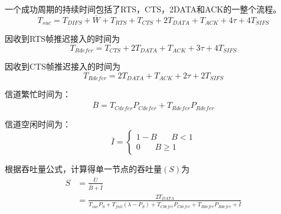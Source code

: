 一个成功周期的持续时间包括了RTS，CTS，2DATA和ACK的一整个流程。
\begin{equation}
T_{suc}=T_{DIFS}+\overline W+T_{RTS}+T_{CTS}+2T_{DATA}+T_{ACK}+4\tau+4T_{SIFS}
\end{equation}

因收到RTS帧推迟接入的时间为
\begin{equation}
T_{Rdefer}=T_{CTS}+2T_{DATA}+T_{ACK}+3\tau+4T_{SIFS}
\end{equation}

因收到CTS帧推迟接入的时间为
\begin{equation}
T_{Rdefer}=2T_{DATA}+T_{ACK}+2\tau+2T_{SIFS}
\end{equation}

信道繁忙时间为：
\begin{equation}
\overline B=T_{Cdefer}P_{Cdefer}+T_{Rdefer}P_{Rdefer}
\end{equation}

信道空闲时间为：
\begin{equation}
\overline I=\left\{
\begin{aligned}
1-B \ \ \ \ \ \ \ \ B<1\\
0\ \ \ \ \ \ \ \    B\ge 1
\end{aligned}
\right.
\end{equation}

根据吞吐量公式，计算得单一节点的吞吐量$(S)$为
\begin{equation}
\begin{aligned}
S&=\frac{\overline U}{\overline B+\overline I}\\&=\frac{2T_{DATA}}{ T_{suc}P_S+T_{fail}(\lambda-P_S )+ T_{Cdefer}P_{Cdefer}+T_{Rdefer}P_{Rdefer}+\overline I}
\end{aligned}
\end{equation}

\endinput